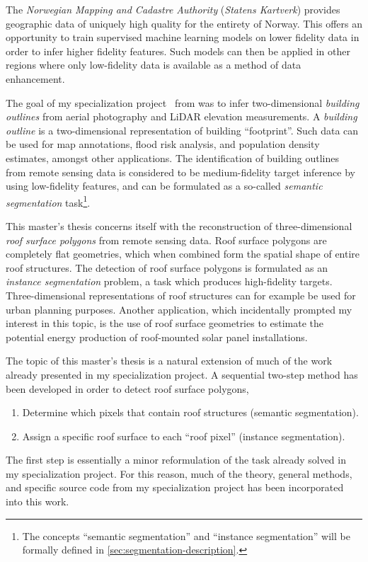 The \textit{Norwegian Mapping and Cadastre Authority} (\textit{Statens Kartverk}) provides geographic data of uniquely high quality for the entirety of Norway.
This offers an opportunity to train supervised machine learning models on lower fidelity data in order to infer higher fidelity features.
Such models can then be applied in other regions where only low-fidelity data is available as a method of data enhancement.

The goal of my specialization project~\cite{specialization-project} from  was to infer two-\linebreak{}dimensional \textit{building outlines} from aerial photography and LiDAR elevation measurements.
A \textit{building outline} is a two-dimensional representation of building \enquote{footprint}.
Such data can be used for map annotations, flood risk analysis, and population density estimates, amongst other applications.
The identification of building outlines from remote sensing data is considered to be medium-fidelity target inference by using low-fidelity features, and can be formulated as a so-called \textit{semantic segmentation} task\footnote{The concepts \enquote{semantic segmentation} and \enquote{instance segmentation} will be formally defined in \cref{sec:segmentation-description}.}.

This master's thesis concerns itself with the reconstruction of three-dimensional \textit{roof surface polygons} from remote sensing data.
Roof surface polygons are completely flat geometries, which when combined form the spatial shape of entire roof structures.
The detection of roof surface polygons is formulated as an \textit{instance segmentation} problem, a task which produces high-fidelity targets.
Three-dimensional representations of roof structures can for example be used for urban planning purposes.
Another application, which incidentally prompted my interest in this topic, is the use of roof surface geometries to estimate the potential energy production of roof-mounted solar panel installations.

The topic of this master's thesis is a natural extension of much of the work already presented in my specialization project.
A sequential two-step method has been developed in order to detect roof surface polygons,
\begin{enumerate}[noitemsep]
  \item Determine which pixels that contain roof structures (semantic segmentation).
  \item Assign a specific roof surface to each \enquote{roof pixel} (instance segmentation).
\end{enumerate}
The first step is essentially a minor reformulation of the task already solved in my specialization project.
For this reason, much of the theory, general methods, and specific source code from my specialization project has been incorporated into this work.

